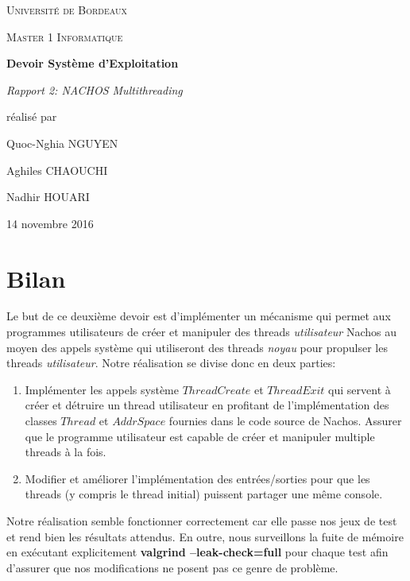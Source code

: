 \documentclass[12pt,a4paper]{article}
\begin{document}
\begin{titlepage}
\centering
{\scshape\LARGE Université de Bordeaux \par}
{\scshape\Large Master 1 Informatique \par}
\vspace{3cm}

{\Huge\bfseries Devoir Système d'Exploitation \par}
\vspace{0.5cm}
{\Large\itshape Rapport 2: NACHOS Multithreading \par}

\vfill
réalisé par \par
Quoc-Nghia \textsc{NGUYEN} \par
Aghiles \textsc{CHAOUCHI} \par
Nadhir \textsc{HOUARI} \par
\vfill

{\large 14 novembre 2016\par}

\end{titlepage}

\section{Bilan}
Le but de ce deuxième devoir est d'implémenter un mécanisme qui permet aux programmes utilisateurs de créer et manipuler des threads \textit{utilisateur} Nachos au moyen des appels système qui utiliseront des threads \textit{noyau} pour propulser les threads \textit{utilisateur}. Notre réalisation se divise donc en deux parties:

\begin{enumerate}
\item Implémenter les appels système $ThreadCreate$ et $ThreadExit$ qui servent à créer et détruire un thread utilisateur en profitant de l'implémentation des classes $Thread$ et $AddrSpace$ fournies dans le code source de Nachos. Assurer que le programme utilisateur est capable de créer et manipuler multiple threads à la fois.
\item Modifier et améliorer l'implémentation des entrées/sorties pour que les threads (y compris le thread initial) puissent partager une même console.
\end{enumerate}

Notre réalisation semble fonctionner correctement car elle passe nos jeux de test et rend bien les résultats attendus. En outre, nous surveillons la fuite de mémoire en exécutant explicitement \textbf{valgrind --leak-check=full} pour chaque test afin d'assurer que nos modifications ne posent pas ce genre de problème.
\end{document}
